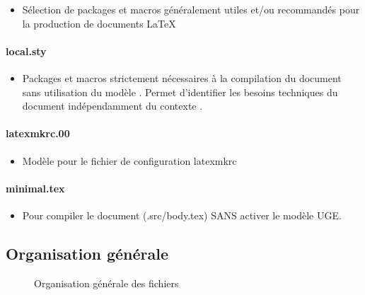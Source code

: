 \begin{itemize}
\item Sélection de packages et macros généralement utiles et/ou recommandés pour la production de documents LaTeX
\end{itemize}

\paragraph{local.sty}

\begin{itemize}
\item Packages et macros strictement nécessaires à la compilation du document sans utilisation du modèle \UGE.
  Permet d'identifier les besoins techniques du document indépendamment du contexte \UGE.
\end{itemize}

\paragraph{latexmkrc.00}

\begin{itemize}
\item Modèle pour le fichier de configuration latexmkrc
\end{itemize}


\paragraph{minimal.tex}

\begin{itemize}
\item Pour compiler le document (.src/body.tex) SANS activer le modèle UGE.
\end{itemize}


\subsection{Organisation générale}

\begin{figure}
  \centering
  \caption{Organisation générale des fichiers}
\end{figure}

